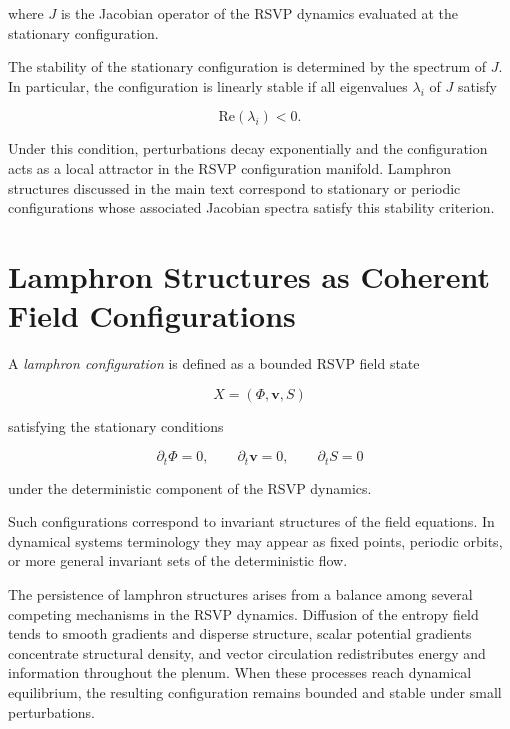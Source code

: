 \documentclass[12pt]{article}
\begin{document}
where $J$ is the Jacobian operator of the RSVP dynamics evaluated at the stationary configuration.

The stability of the stationary configuration is determined by the spectrum of $J$. In particular, the configuration is linearly stable if all eigenvalues $\lambda_i$ of $J$ satisfy

\begin{equation}
\mathrm{Re}(\lambda_i) < 0 .
\end{equation}

Under this condition, perturbations decay exponentially and the configuration acts as a local attractor in the RSVP configuration manifold. Lamphron structures discussed in the main text correspond to stationary or periodic configurations whose associated Jacobian spectra satisfy this stability criterion.

\section{Lamphron Structures as Coherent Field Configurations}
\label{sec:lamphron}

A \emph{lamphron configuration} is defined as a bounded RSVP field state

\begin{equation}
X = (\Phi,\mathbf{v},S)
\end{equation}

satisfying the stationary conditions

\begin{equation}
\partial_t \Phi = 0, \qquad
\partial_t \mathbf{v} = 0, \qquad
\partial_t S = 0
\end{equation}

under the deterministic component of the RSVP dynamics.

Such configurations correspond to invariant structures of the field equations. In dynamical systems terminology they may appear as fixed points, periodic orbits, or more general invariant sets of the deterministic flow.

The persistence of lamphron structures arises from a balance among several competing mechanisms in the RSVP dynamics. Diffusion of the entropy field tends to smooth gradients and disperse structure, scalar potential gradients concentrate structural density, and vector circulation redistributes energy and information throughout the plenum. When these processes reach dynamical equilibrium, the resulting configuration remains bounded and stable under small perturbations.
\end{document}
